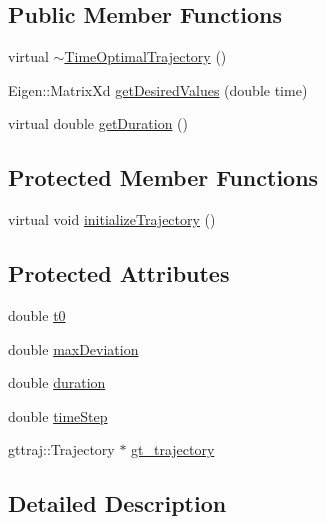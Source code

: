 \subsection*{Public Member Functions}
\begin{DoxyCompactItemize}
\item 
virtual \hyperlink{classocra_1_1TimeOptimalTrajectory_a4f4e9ce2cd5b313d8418893d89b5cc8f}{$\sim$\+Time\+Optimal\+Trajectory} ()
\item 
Eigen\+::\+Matrix\+Xd \hyperlink{classocra_1_1TimeOptimalTrajectory_a42ca0b579494ac0c3c4c842896e592f9}{get\+Desired\+Values} (double time)
\item 
virtual double \hyperlink{classocra_1_1TimeOptimalTrajectory_a561d2d6ad9c40c88783265a91193a0ab}{get\+Duration} ()
\end{DoxyCompactItemize}
\subsection*{Protected Member Functions}
\begin{DoxyCompactItemize}
\item 
virtual void \hyperlink{classocra_1_1TimeOptimalTrajectory_a1ddd759810abea6db2462dca3aae585c}{initialize\+Trajectory} ()
\end{DoxyCompactItemize}
\subsection*{Protected Attributes}
\begin{DoxyCompactItemize}
\item 
double \hyperlink{classocra_1_1TimeOptimalTrajectory_a7c58d1493c4227bb5d209de36ade154e}{t0}
\item 
double \hyperlink{classocra_1_1TimeOptimalTrajectory_a7709c9a5e8ab5e48657cc965f59d0f57}{max\+Deviation}
\item 
double \hyperlink{classocra_1_1TimeOptimalTrajectory_a6c6b5ffec595af24fd0061d47f85ebdf}{duration}
\item 
double \hyperlink{classocra_1_1TimeOptimalTrajectory_aacee4e110122959c3f47c07a9b7796bf}{time\+Step}
\item 
gttraj\+::\+Trajectory $\ast$ \hyperlink{classocra_1_1TimeOptimalTrajectory_a350a0c047e3f65fc7dd55d6b5dfa5796}{gt\+\_\+trajectory}
\end{DoxyCompactItemize}


\subsection{Detailed Description}


